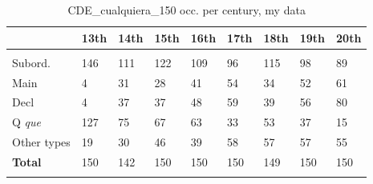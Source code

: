 \begin{table}


\begin{tabularx}{\textwidth}{lYYYYYYYY}
\lsptoprule
&13th &  14th &  15th &  16th &  17th &  18th &  19th &  20th \\
\midrule
\tablevspace
{}\\
\midrule
Subord.&146  &  111  &  122  &  109  &  96   &  115  &  98   &  89   \\
Main&4    &  31   &  28   &  41   &  54   &  34   &  52   &  61   \\
Decl&4    &  37   &  37   &  48   &  59   &  39   &  56   &  80 \\
Q \textit{que}&127  &  75   &  67   &  63   &  33   &  53   &  37   &  15 \\
Other types&19   &  30   &  46   &  39   &  58   &  57   &  57   &  55\\
\midrule
\textbf{Total} &150  &  142  &  150  &  150  &  150  &  149  &  150  &  150 \\
\lspbottomrule
\end{tabularx}
\caption{\label{tab:key:14} CDE\_cualquiera\_150 occ. per century, my data}
\end{table}

